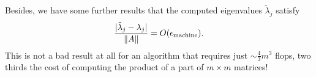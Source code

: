 Besides, we have some further results that the computed eigenvalues $ \tilde \lambda _j $ satisfy 
\begin{equation}
\label{eq: err eigenvalue QR}
    \frac{|\tilde \lambda _j -\lambda _j|}{\|A\|} = O(\epsilon_{\text{machine}}). 
\end{equation}
This is not a bad result at all for an algorithm that requires just $\sim \frac{4}{3}m^3$ flops, two thirds the cost of computing the product of a part of $m\times m$ matrices! 


